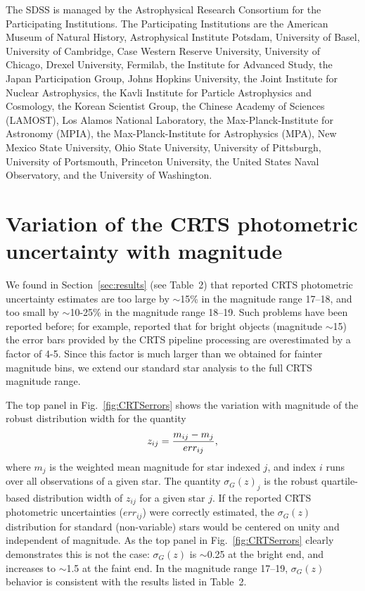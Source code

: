 \documentclass[fleqn,usenatbib]{mnras}  %
\begin{document}
The SDSS is managed by the Astrophysical Research Consortium for the Participating Institutions. 
The Participating Institutions are the American Museum of Natural History, Astrophysical Institute 
Potsdam, University of Basel, University of Cambridge, Case Western Reserve University, University
of Chicago, Drexel University, Fermilab, the Institute for Advanced Study, the Japan Participation 
Group, Johns Hopkins University, the Joint Institute for Nuclear Astrophysics, the Kavli Institute for 
Particle Astrophysics and Cosmology, the Korean Scientist Group, the Chinese Academy of Sciences 
(LAMOST), Los Alamos National Laboratory, the Max-Planck-Institute for Astronomy (MPIA), the 
Max-Planck-Institute for Astrophysics (MPA), New Mexico State University, Ohio State University, 
University of Pittsburgh, University of Portsmouth, Princeton University, the United States Naval
Observatory, and the University of Washington. 




 


\appendix
\section{Variation of the CRTS photometric uncertainty with magnitude} 

We found in Section~\ref{sec:results} (see Table~2) that reported CRTS photometric uncertainty estimates 
are too large by $\sim$15\% in the magnitude range 17--18, and too small by $\sim$10-25\% in the 
magnitude range 18--19. Such problems have been reported before; for example, \cite{vaughan2016}
reported that for bright objects (magnitude $\sim$15) the error bars provided by the CRTS pipeline 
processing are overestimated by a factor of 4-5. Since this factor is much larger than we obtained
for fainter magnitude bins, we extend our standard star analysis to the full CRTS magnitude range. 

The top panel in Fig.~\ref{fig:CRTSerrors} shows the variation with magnitude of the robust distribution 
width for the quantity 
\begin{equation} 
\label{eq:z} 
           z_{ij} = { m_{ij} - m_j \over err_{ij} },
\end{equation}
where  $m_{j}$ is the weighted mean magnitude for star indexed $j$, and index $i$ runs over all
observations of a given star. The quantity $\sigma_G(z)_j$ is the robust quartile-based distribution 
width of $z_{ij}$ for a given star $j$. If the reported CRTS photometric uncertainties ($err_{ij}$) were 
correctly estimated, the $\sigma_G(z)$ distribution for standard (non-variable) stars would be 
centered on unity and independent of magnitude. As the  top panel in Fig.~\ref{fig:CRTSerrors} 
clearly demonstrates this is not the case: $\sigma_G(z)$ is $\sim$0.25 at the bright end, and 
increases to $\sim$1.5 at the faint end. In the magnitude range 17--19,  $\sigma_G(z)$ 
behavior is consistent with the results listed in Table~2. 
\end{document}

